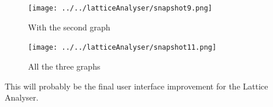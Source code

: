 			\begin{figure}[bth]
				\begin{center}
					\texttt{[image: ../../latticeAnalyser/snapshot9.png]}
				\end{center}
			\caption[With the second graph]{With the second graph}
			\label{snapshot9}
			\end{figure}

			\begin{figure}[bth]
				\begin{center}
					\texttt{[image: ../../latticeAnalyser/snapshot11.png]}
				\end{center}
			\caption[All the three graphs]{All the three graphs}
			\label{snapshot11}
			\end{figure}
			This will probably be the final user interface improvement for the Lattice Analyser.
